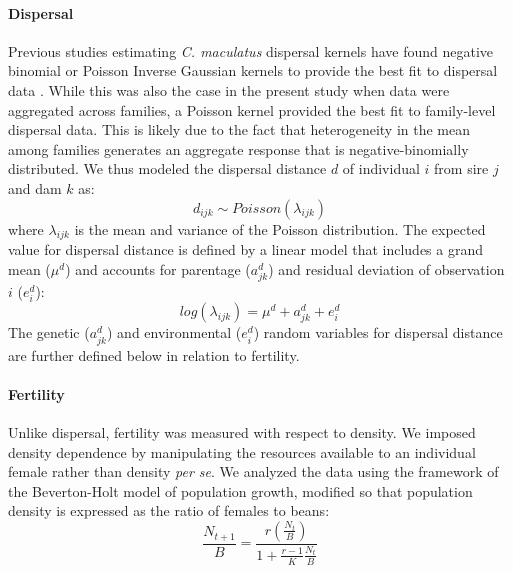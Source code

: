 \documentclass[11pt]{article}
\newcommand{\tom}[1]{{\textit{\color{WildStrawberry}{[#1]}}}}
\begin{document}
\paragraph{Dispersal}
Previous studies estimating \textit{C. maculatus} dispersal kernels have found negative binomial or Poisson Inverse Gaussian kernels to provide the best fit to dispersal data \citep{miller_sex_2013,wagner_genetic_2016,ochocki_rapid_2017}.
While this was also the case in the present study when data were aggregated across families, a Poisson kernel provided the best fit to family-level dispersal data.
This is likely due to the fact that heterogeneity in the mean among families generates an aggregate response that is negative-binomially distributed.
We thus modeled the dispersal distance $d$ of individual $i$ from sire $j$ and dam $k$ as:
%
\begin{equation}\label{corr:dispersal_random}
  d_{ijk} \sim \mathit{Poisson}(\lambda_{ijk})
\end{equation}
%
where $\lambda_{ijk}$ is the mean and variance of the Poisson distribution.
The expected value for dispersal distance is defined by a linear model that includes a grand mean ($\mu^{d}$) and accounts for parentage ($a^{d}_{jk}$) and residual deviation of observation $i$ ($e^{d}_i$):
%
\begin{equation} \label{corr:dispersal_linmod}
  log(\lambda_{ijk}) = \mu^{d} + a^{d}_{jk} + e^{d}_{i}
\end{equation}
%
The genetic ($a^{d}_{jk}$) and environmental ($e^{d}_i$) random variables for dispersal distance are further defined below in relation to fertility.

\paragraph{Fertility}
Unlike dispersal, fertility was measured with respect to density.
We imposed density dependence by manipulating the resources available to an individual female rather than density \textit{per se}.
We analyzed the data using the framework of the Beverton-Holt model of population growth, modified so that population density is expressed as the ratio of females to beans:
%
\begin{equation}\label{corr:BevHoltFull}
  \frac{N_{t+1}}{B} = \frac{r(\frac{N_{t}}{B})}{1 + \frac{r-1}{K}\frac{N_{t}}{B}}
\end{equation}
%
\end{document}
